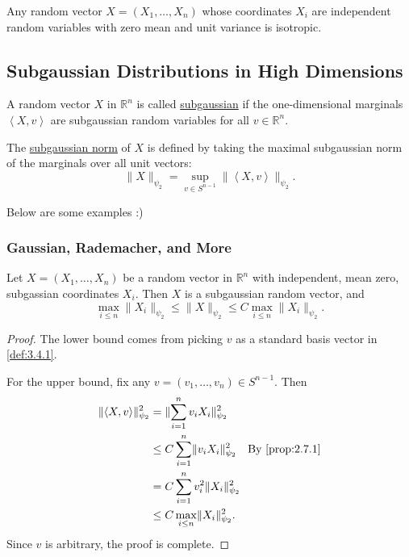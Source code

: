 \begin{example}
\label{ex:3.3.17}
Any random vector $X = (X_1, \dots, X_n)$ whose coordinates $X_i$ are independent random variables with zero 
mean and unit variance is isotropic. 
\end{example}


\subsection{Subgaussian Distributions in High Dimensions}
\begin{definition}[]
\label{def:3.4.1}
A random vector $X$ in $\mathbb{R}^n$ is called \underline{subgaussian} if the one-dimensional marginals 
$\left\langle X, v \right\rangle$ are subgaussian random variables for all $v \in \mathbb{R}^n$. 

The \underline{subgaussian norm} of $X$ is defined by taking the maximal subgaussian norm of the marginals 
over all unit vectors: 
\[ \lVert X \rVert_{\psi_2} = \sup_{v \in S^{n - 1}} \lVert \left\langle X, v \right\rangle \rVert_{\psi_2}. \]
\end{definition}

Below are some examples :)

\subsubsection{Gaussian, Rademacher, and More}
\begin{lemma}
\label{lem:3.4.2}
Let $X = (X_1, \dots, X_n)$ be a random vector in $\mathbb{R}^n$ with independent, mean zero, subgassian 
coordinates $X_i$. Then $X$ is a subgaussian random vector, and 
\[ \max_{i \leq n} \lVert X_i \rVert_{\psi_2} \leq \lVert X \rVert_{\psi_2} 
\leq C \max_{i \leq n} \lVert X_i \rVert_{\psi_2}. \]
\end{lemma}

\begin{proof}
The lower bound comes from picking $v$ as a standard basis vector in \cref{def:3.4.1}. 

For the upper bound, fix any $v = (v_1, \dots, v_n) \in S^{n - 1}$. Then 
\begin{align*}
	\lVert \left\langle X, v \right\rangle \rVert_{\psi_2}^2 
	&= \lVert \sum_{i = 1}^{n} v_i X_i \rVert_{\psi_2}^2 \\ 
	&\leq C \sum_{i = 1}^{n} \lVert v_i X_i \rVert_{\psi_2}^2 \quad \text{By \cref{prop:2.7.1}} \\
	&= C \sum_{i = 1}^{n} v_i^2 \lVert X_i \rVert_{\psi_2}^2 \\
	&\leq C \max_{i \leq n} \lVert X_i \rVert_{\psi_2}^2.
\end{align*}
Since $v$ is arbitrary, the proof is complete.
\end{proof}

